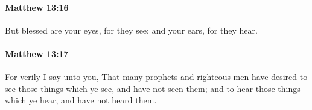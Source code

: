 		\paragraph{Matthew 13:16} %
			\label{MATTHEW-13-16}

			But blessed are your eyes, for they see: and your ears, for they hear.

			\begin{framed}
			\scriptsize
				\begin{compactdesc}
					\item[SBLG] 
				\end{compactdesc}
			\end{framed}

		\paragraph{Matthew 13:17} %
			\label{MATTHEW-13-17}

			For verily I say unto you, That many prophets and righteous men have desired to see those things which ye see, and have not seen them; and to hear those things which ye hear, and have not heard them.

